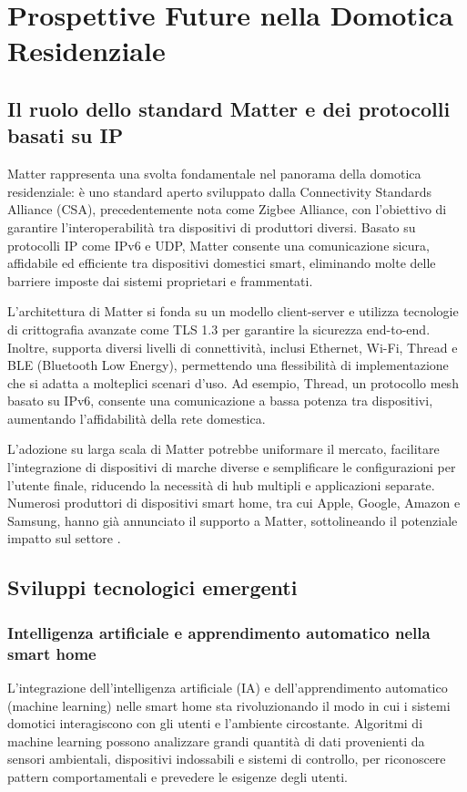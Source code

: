 \chapter{Prospettive Future nella Domotica Residenziale}

\section{Il ruolo dello standard Matter e dei protocolli basati su IP}
Matter rappresenta una svolta fondamentale nel panorama della domotica residenziale: è uno standard aperto sviluppato dalla Connectivity Standards Alliance (CSA), precedentemente nota come Zigbee Alliance, con l’obiettivo di garantire l'interoperabilità tra dispositivi di produttori diversi. Basato su protocolli IP come IPv6 e UDP, Matter consente una comunicazione sicura, affidabile ed efficiente tra dispositivi domestici smart, eliminando molte delle barriere imposte dai sistemi proprietari e frammentati.

L’architettura di Matter si fonda su un modello client-server e utilizza tecnologie di crittografia avanzate come TLS 1.3 per garantire la sicurezza end-to-end. Inoltre, supporta diversi livelli di connettività, inclusi Ethernet, Wi-Fi, Thread e BLE (Bluetooth Low Energy), permettendo una flessibilità di implementazione che si adatta a molteplici scenari d’uso. Ad esempio, Thread, un protocollo mesh basato su IPv6, consente una comunicazione a bassa potenza tra dispositivi, aumentando l’affidabilità della rete domestica.

L'adozione su larga scala di Matter potrebbe uniformare il mercato, facilitare l'integrazione di dispositivi di marche diverse e semplificare le configurazioni per l'utente finale, riducendo la necessità di hub multipli e applicazioni separate. Numerosi produttori di dispositivi smart home, tra cui Apple, Google, Amazon e Samsung, hanno già annunciato il supporto a Matter, sottolineando il potenziale impatto sul settore \parencite{matterCSA, zillner2022matter}.

\section{Sviluppi tecnologici emergenti}

\subsection{Intelligenza artificiale e apprendimento automatico nella smart home}
L'integrazione dell'intelligenza artificiale (IA) e dell'apprendimento automatico (machine learning) nelle smart home sta rivoluzionando il modo in cui i sistemi domotici interagiscono con gli utenti e l'ambiente circostante. Algoritmi di machine learning possono analizzare grandi quantità di dati provenienti da sensori ambientali, dispositivi indossabili e sistemi di controllo, per riconoscere pattern comportamentali e prevedere le esigenze degli utenti.

